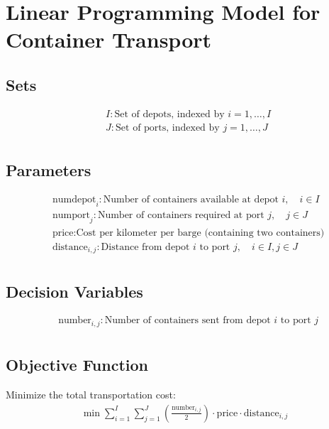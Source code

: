 \documentclass{article}
\begin{document}
\section*{Linear Programming Model for Container Transport}

\subsection*{Sets}
\begin{align*}
    & I: \text{Set of depots, indexed by } i = 1, \ldots, I \\
    & J: \text{Set of ports, indexed by } j = 1, \ldots, J \\
\end{align*}

\subsection*{Parameters}
\begin{align*}
    & \text{numdepot}_i: \text{Number of containers available at depot } i, \quad i \in I \\
    & \text{numport}_j: \text{Number of containers required at port } j, \quad j \in J \\
    & \text{price}: \text{Cost per kilometer per barge (containing two containers)} \\
    & \text{distance}_{i,j}: \text{Distance from depot } i \text{ to port } j, \quad i \in I, j \in J \\
\end{align*}

\subsection*{Decision Variables}
\begin{align*}
    & \text{number}_{i,j}: \text{Number of containers sent from depot } i \text{ to port } j \\
\end{align*}

\subsection*{Objective Function}
Minimize the total transportation cost:
\begin{align*}
    \min \sum_{i=1}^{I} \sum_{j=1}^{J} \left( \frac{\text{number}_{i,j}}{2} \right) \cdot \text{price} \cdot \text{distance}_{i,j}
\end{align*}
\end{document}
